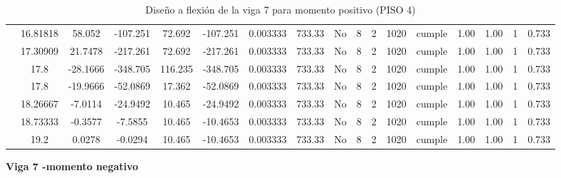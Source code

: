 \begin{table}[H]
{\begin{tabular}{|c|c|c|c|c|c|c|c|c|c|c|c|c|c|c|c|c|}
\cline{2-17}    & 16.81818 & 58.052 & -107.251 & 72.692 & -107.251 & 0.003333 & 733.33 & No  & 8   & 2   & 1020 & \cellcolor[rgb]{ .776,  .937,  .808}cumple & 1.00 & 1.00 & 1   & 0.733 \bigstrut\\
\cline{2-17}    & 17.30909 & 21.7478 & -217.261 & 72.692 & -217.261 & 0.003333 & 733.33 & No  & 8   & 2   & 1020 & \cellcolor[rgb]{ .776,  .937,  .808}cumple & 1.00 & 1.00 & 1   & 0.733 \bigstrut\\
\cline{2-17}    & \cellcolor[rgb]{ .851,  .882,  .949}17.8 & -28.1666 & -348.705 & 116.235 & -348.705 & 0.003333 & 733.33 & No  & 8   & 2   & 1020 & \cellcolor[rgb]{ .776,  .937,  .808}cumple & 1.00 & 1.00 & 1   & 0.733 \bigstrut\\
\cline{2-17}    & \cellcolor[rgb]{ .851,  .882,  .949}17.8 & -19.9666 & -52.0869 & 17.362 & -52.0869 & 0.003333 & 733.33 & No  & 8   & 2   & 1020 & \cellcolor[rgb]{ .776,  .937,  .808}cumple & 1.00 & 1.00 & 1   & 0.733 \bigstrut\\
\cline{2-17}    & 18.26667 & -7.0114 & -24.9492 & 10.465 & -24.9492 & 0.003333 & 733.33 & No  & 8   & 2   & 1020 & \cellcolor[rgb]{ .776,  .937,  .808}cumple & 1.00 & 1.00 & 1   & 0.733 \bigstrut\\
\cline{2-17}    & 18.73333 & -0.3577 & -7.5855 & 10.465 & -10.4653 & 0.003333 & 733.33 & No  & 8   & 2   & 1020 & \cellcolor[rgb]{ .776,  .937,  .808}cumple & 1.00 & 1.00 & 1   & 0.733 \bigstrut\\
\cline{2-17}    & 19.2 & 0.0278 & -0.0294 & 10.465 & -10.4653 & 0.003333 & 733.33 & No  & 8   & 2   & 1020 & \cellcolor[rgb]{ .776,  .937,  .808}cumple & 1.00 & 1.00 & 1   & 0.733 \bigstrut\\
\hline
\end{tabular}%

  

  }%
    \caption{Diseño a flexión de la viga 7 para momento positivo (PISO 4) }
  \label{tab:F VG7 P4 M+}%
\end{table}%
\newpage
\textbf{Viga 7 -momento negativo}
